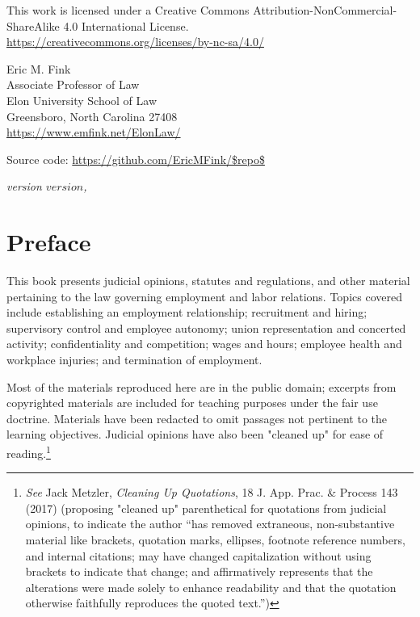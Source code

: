 \begin{small}
\raggedright{This work is licensed under a Creative Commons Attribution-NonCommercial-ShareAlike 4.0 International License.} \\
\url{https://creativecommons.org/licenses/by-nc-sa/4.0/}

\vspace{1em}

Eric M. Fink\\
Associate Professor of Law \\
Elon University School of Law \\
Greensboro, North Carolina 27408 \\
\url{https://www.emfink.net/ElonLaw/}

\vspace{1em}

Source code: \url{https://github.com/EricMFink/$repo$}

\itshape{version $version$, \monthyear}

\end{small}
\endgroup

\clearpage


\thispagestyle{empty}

\vspace*{\fill}
\vspace*{\fill}

\chapter*{Preface}

This book presents judicial opinions, statutes and regulations, and other material pertaining to the law governing employment and labor relations. Topics covered include establishing an employment relationship; recruitment and hiring; supervisory control and employee autonomy; union representation and concerted activity; confidentiality and competition; wages and hours; employee health and workplace injuries; and termination of employment.

Most of the materials reproduced here are in the public domain; excerpts from copyrighted materials are included for teaching purposes under the fair use doctrine. Materials have been redacted to omit passages not pertinent to the learning objectives. Judicial opinions have also been "cleaned up" for ease of reading.\footnote{\textit{See} Jack Metzler, {\textit{Cleaning Up Quotations}}, 18 J. App. Prac. \& Process 143 (2017) (proposing "cleaned up" parenthetical for quotations from judicial opinions, to indicate the author “has removed extraneous, non-substantive material like brackets, quotation marks, ellipses, footnote reference numbers, and internal citations; may have changed capitalization without using brackets to indicate that change; and affirmatively represents that the alterations were made solely to enhance readability and that the quotation otherwise faithfully reproduces the quoted text.”)} 